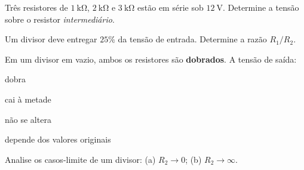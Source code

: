 \blocofixacao
\begin{questao}[1]{}

Três resistores de $\SI{1}{\kilo\ohm}$, $\SI{2}{\kilo\ohm}$ e
$\SI{3}{\kilo\ohm}$ estão em série sob $\SI{12}{\volt}$. Determine a tensão
sobre o resistor \emph{intermediário}.


\end{questao}
\begin{questao}[1]{}

Um divisor deve entregar $25\%$ da tensão de entrada. Determine a razão
$R_1/R_2$.


\end{questao}
\begin{questao}[1]{}

Em um divisor em vazio, ambos os resistores são \textbf{dobrados}. A tensão de
saída:
\begin{alternativas}[2]
\item dobra
\item cai à metade
\item não se altera
\item depende dos valores originais
\end{alternativas}


\end{questao}
\begin{questao}[1]{}

Analise os casos-limite de um divisor: (a) $R_2\to0$; (b) $R_2\to\infty$.


\end{questao}

